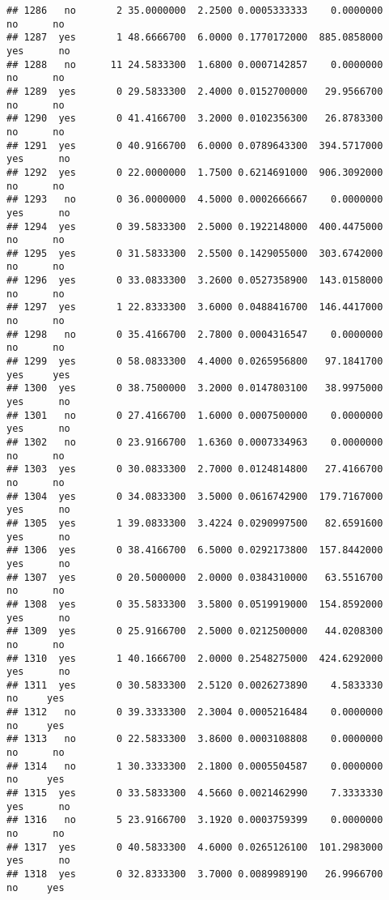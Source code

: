 \documentclass[]{article}
\begin{document}
\begin{verbatim}
## 1286   no       2 35.0000000  2.2500 0.0005333333    0.0000000    no      no
## 1287  yes       1 48.6666700  6.0000 0.1770172000  885.0858000   yes      no
## 1288   no      11 24.5833300  1.6800 0.0007142857    0.0000000    no      no
## 1289  yes       0 29.5833300  2.4000 0.0152700000   29.9566700    no      no
## 1290  yes       0 41.4166700  3.2000 0.0102356300   26.8783300    no      no
## 1291  yes       0 40.9166700  6.0000 0.0789643300  394.5717000   yes      no
## 1292  yes       0 22.0000000  1.7500 0.6214691000  906.3092000    no      no
## 1293   no       0 36.0000000  4.5000 0.0002666667    0.0000000   yes      no
## 1294  yes       0 39.5833300  2.5000 0.1922148000  400.4475000    no      no
## 1295  yes       0 31.5833300  2.5500 0.1429055000  303.6742000    no      no
## 1296  yes       0 33.0833300  3.2600 0.0527358900  143.0158000    no      no
## 1297  yes       1 22.8333300  3.6000 0.0488416700  146.4417000    no      no
## 1298   no       0 35.4166700  2.7800 0.0004316547    0.0000000    no      no
## 1299  yes       0 58.0833300  4.4000 0.0265956800   97.1841700   yes     yes
## 1300  yes       0 38.7500000  3.2000 0.0147803100   38.9975000   yes      no
## 1301   no       0 27.4166700  1.6000 0.0007500000    0.0000000   yes      no
## 1302   no       0 23.9166700  1.6360 0.0007334963    0.0000000    no      no
## 1303  yes       0 30.0833300  2.7000 0.0124814800   27.4166700    no      no
## 1304  yes       0 34.0833300  3.5000 0.0616742900  179.7167000   yes      no
## 1305  yes       1 39.0833300  3.4224 0.0290997500   82.6591600   yes      no
## 1306  yes       0 38.4166700  6.5000 0.0292173800  157.8442000   yes      no
## 1307  yes       0 20.5000000  2.0000 0.0384310000   63.5516700    no      no
## 1308  yes       0 35.5833300  3.5800 0.0519919000  154.8592000   yes      no
## 1309  yes       0 25.9166700  2.5000 0.0212500000   44.0208300    no      no
## 1310  yes       1 40.1666700  2.0000 0.2548275000  424.6292000   yes      no
## 1311  yes       0 30.5833300  2.5120 0.0026273890    4.5833330    no     yes
## 1312   no       0 39.3333300  2.3004 0.0005216484    0.0000000    no     yes
## 1313   no       0 22.5833300  3.8600 0.0003108808    0.0000000    no      no
## 1314   no       1 30.3333300  2.1800 0.0005504587    0.0000000    no     yes
## 1315  yes       0 33.5833300  4.5660 0.0021462990    7.3333330   yes      no
## 1316   no       5 23.9166700  3.1920 0.0003759399    0.0000000    no      no
## 1317  yes       0 40.5833300  4.6000 0.0265126100  101.2983000   yes      no
## 1318  yes       0 32.8333300  3.7000 0.0089989190   26.9966700    no     yes

\end{verbatim}
\end{document}
